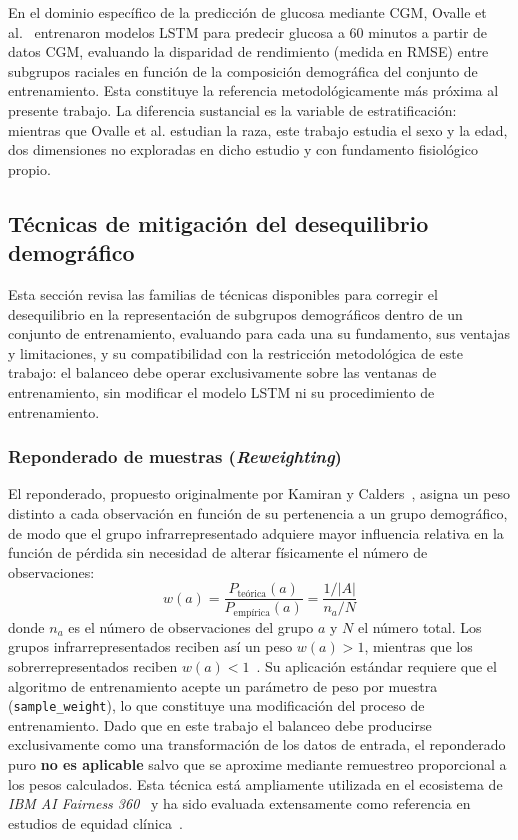 En el dominio específico de la predicción de glucosa mediante CGM, Ovalle et al.~\cite{ovalle2024racial} entrenaron modelos LSTM para predecir glucosa a 60 minutos a partir de datos CGM, evaluando la disparidad de rendimiento (medida en RMSE) entre subgrupos raciales en función de la composición demográfica del conjunto de entrenamiento. Esta constituye la referencia metodológicamente más próxima al presente trabajo. La diferencia sustancial es la variable de estratificación: mientras que Ovalle et al. estudian la raza, este trabajo estudia el sexo y la edad, dos dimensiones no exploradas en dicho estudio y con fundamento fisiológico propio.

\subsection{Técnicas de mitigación del desequilibrio demográfico}
\label{sec:tecnicas_balanceo_demografico}

Esta sección revisa las familias de técnicas disponibles para corregir el desequilibrio en la representación de subgrupos demográficos dentro de un conjunto de entrenamiento, evaluando para cada una su fundamento, sus ventajas y limitaciones, y su compatibilidad con la restricción metodológica de este trabajo: el balanceo debe operar exclusivamente sobre las ventanas de entrenamiento, sin modificar el modelo LSTM ni su procedimiento de entrenamiento.

\subsubsection{Reponderado de muestras (\emph{Reweighting})}
\label{subsec:reweighting}

El reponderado, propuesto originalmente por Kamiran y Calders~\cite{kamiran2012data}, asigna un peso distinto a cada observación en función de su pertenencia a un grupo demográfico, de modo que el grupo infrarrepresentado adquiere mayor influencia relativa en la función de pérdida sin necesidad de alterar físicamente el número de observaciones:
\begin{equation}
    w(a) = \frac{P_{\text{teórica}}(a)}{P_{\text{empírica}}(a)} = \frac{1/|A|}{n_a / N}
\end{equation}
donde $n_a$ es el número de observaciones del grupo $a$ y $N$ el número total. Los grupos infrarrepresentados reciben así un peso $w(a) > 1$, mientras que los sobrerrepresentados reciben $w(a) < 1$~\cite{zliobaite2017measuring,fairmodels2021}. Su aplicación estándar requiere que el algoritmo de entrenamiento acepte un parámetro de peso por muestra (\texttt{sample\_weight}), lo que constituye una modificación del proceso de entrenamiento. Dado que en este trabajo el balanceo debe producirse exclusivamente como una transformación de los datos de entrada, el reponderado puro \textbf{no es aplicable} salvo que se aproxime mediante remuestreo proporcional a los pesos calculados. Esta técnica está ampliamente utilizada en el ecosistema de \emph{IBM AI Fairness 360}~\cite{bellamy2018ai360} y ha sido evaluada extensamente como referencia en estudios de equidad clínica~\cite{ricci2024sociodemographic}.

